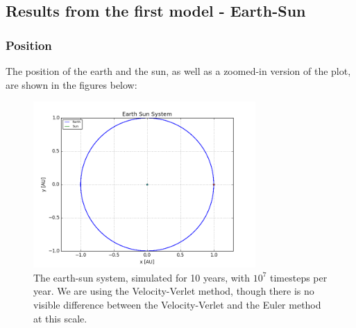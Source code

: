 \documentclass[a4paper, 10pt]{article}
\begin{document}
\subsection{Results from the first model - Earth-Sun}
\subsubsection{Position}
The position of the earth and the sun, as well as a zoomed-in version of the plot, are shown in the figures below:
\begin{figure}[!ht]
    \centering
    \includegraphics[height=2.5in]{earthsun.png}
    \caption{The earth-sun system, simulated for 10 years, with $10^7$ timesteps per year. We are using the Velocity-Verlet method, though there is no visible difference between the Velocity-Verlet and the Euler method at this scale.} \label{fig:earth-sun-figure1}
\end{figure}
\end{document}
